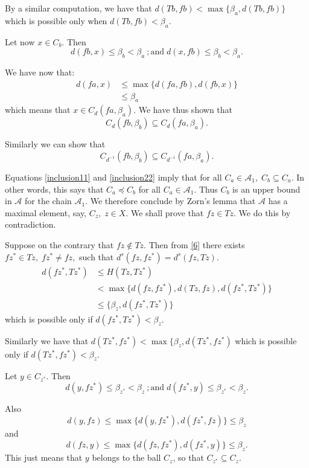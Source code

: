 \documentclass[10pt,a4paper]{article}
\begin{document}
{By a similar computation, we have that $d(Tb,fb)<\max\lbrace  \beta_a,d(Tb,fb)\rbrace$ which is possible only when $d(Tb,fb)< \beta_a.$

Let now $x\in C_b$. Then \[d(fb,x)\leq  \beta_b< \beta_a \ ; \text{and}\; d(x,fb)\leq \beta_b< \beta_a.\]

We have now that:
\begin{align*}
d(fa,x)&\leq \max\lbrace d(fa,fb),d(fb,x)\rbrace \\
&\leq \beta_a
\end{align*}
which means that $x\in C_d(fa,\beta_a)$. We have thus shown that
 \begin{equation} \label{inclusion11} 
 C_d(fb,\beta_b)\subseteq C_d(fa,\beta_a).
 \end{equation}


Similarly we can show that 
\begin{equation} \label{inclusion22} 
C_{d^{-1}}(fb,\beta_b) \subseteq C_{d^{-1}}(fa,\beta_a). 
\end{equation}

Equations \eqref{inclusion11} and \eqref{inclusion22} imply that for all $C_a\in \mathcal{A}_1,\;C_b\subseteq C_a$. In other words, this says that $C_a\preceq C_b$ for all $C_a\in \mathcal{A}_1$. Thus $C_b$ is an upper bound in $\mathcal{A}$ for the chain $\mathcal{A}_1$. We therefore conclude by Zorn's lemma that $\mathcal{A}$ has a maximal element, say, $C_z,\; z\in X$. We shall prove that $fz\in Tz$. We do this by contradiction.

Suppose on the contrary that $fz\not \in Tz$. Then from \eqref{6} there exists $fz^{\ast}\in Tz,\; fz^{\ast}\neq fz,$ such that $d^s(fz,fz^{\ast})=d^s(fz,Tz).$
\begin{align*}
d(fz^{\ast},Tz^{\ast})&\leq H(Tz,Tz^{\ast})\\
&< \max\lbrace d(fz,fz^{\ast}),d(Tz,fz),d(fz^{\ast},Tz^{\ast})\rbrace \\
& \leq \{\beta_z,d(fz^{\ast},Tz^{\ast})\}
\end{align*}
which is possible only if $d(fz^{\ast},Tz^{\ast})<\beta_z.$ 

Similarly we have that $d(Tz^{\ast},fz^{\ast})<\max\lbrace \beta_z, d(Tz^{\ast},fz^{\ast})$ which is possible only if $d(Tz^{\ast},fz^{\ast})<\beta_z$.

Let $y\in C_{z^{\ast}}$. 
Then \[ d(y,fz^{\ast})\leq \beta_{z^*}< \beta_z \ ; \text{and}\; d(fz^{\ast},y)\leq \beta_{z^*}< \beta_z. \]

Also \[ d(y,fz)\leq \max\lbrace d(y,fz^{\ast}),d(fz^{\ast},fz)\rbrace \leq \beta_z \] and \[ d(fz,y)\leq \max \lbrace d(fz,fz^{\ast}),d(fz^{\ast},y)\rbrace \leq \beta_z.\] This just means that $y$ belongs to the ball $C_{z}$, so that $C_{z^{\ast}}\subseteq C_{z}.$ 

}
\end{document}
